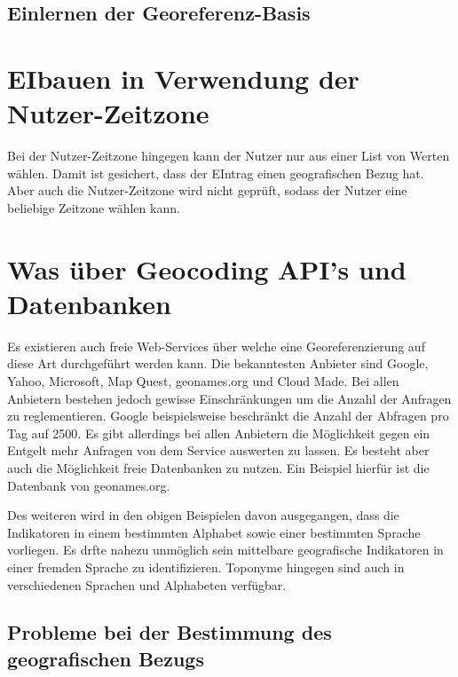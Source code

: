 			\subsection{Einlernen der Georeferenz-Basis}




\section{EIbauen in Verwendung der Nutzer-Zeitzone} 

Bei der Nutzer-Zeitzone hingegen kann der Nutzer nur aus einer List von Werten wählen. 
				Damit ist gesichert, dass der EIntrag einen geografischen Bezug hat. 
				Aber auch die Nutzer-Zeitzone wird nicht geprüft, sodass der Nutzer eine beliebige Zeitzone wählen kann. 


\section{Was über Geocoding API's und Datenbanken}


				Es existieren auch freie Web-Services über welche eine Georeferenzierung auf diese Art durchgeführt werden kann. 
				Die bekanntesten Anbieter sind Google, Yahoo, Microsoft, Map Quest, geonames.org und Cloud Made. 
				Bei allen Anbietern bestehen jedoch gewisse Einschränkungen um die Anzahl der Anfragen zu reglementieren.
				Google beispielsweise beschränkt die Anzahl der Abfragen pro Tag auf 2500.
				Es gibt allerdings bei allen Anbietern die Möglichkeit gegen ein Entgelt mehr Anfragen von dem Service auswerten zu lassen.
				Es besteht aber auch die Möglichkeit freie Datenbanken zu nutzen. 
				Ein Beispiel hierfür ist die Datenbank von geonames.org.
				

				
	
Des weiteren wird in den obigen Beispielen davon ausgegangen, dass die Indikatoren in einem bestimmten Alphabet sowie einer bestimmten Sprache vorliegen.
Es drfte nahezu unmöglich sein mittelbare geografische Indikatoren in einer fremden Sprache zu identifizieren.
Toponyme hingegen sind auch in verschiedenen Sprachen und Alphabeten verfügbar. 




\subsection{Probleme bei der Bestimmung des geografischen Bezugs}  

